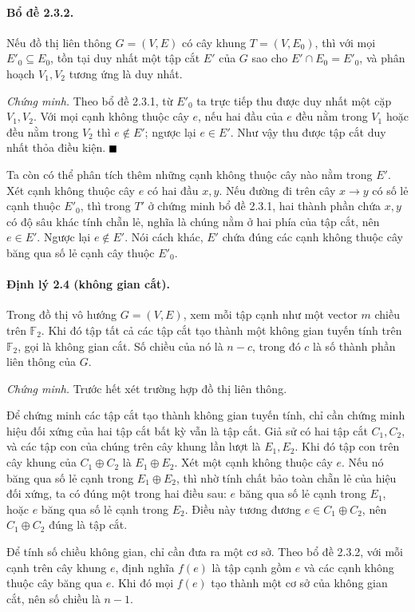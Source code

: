 \documentclass[11pt]{article}
\renewcommand{\leadsto}{\mathrel{\longrightarrow}}
\providecommand{\square}{\mathord{\vcenter{\hrule height .6em width .6em}}}
\begin{document}
\paragraph{Bổ đề 2.3.2.}
Nếu đồ thị liên thông $G=(V,E)$ có cây khung $T=(V,E_0)$, thì với mọi
$E'_0\subseteq E_0$, tồn tại duy nhất một tập cắt $E'$ của $G$ sao cho
$E'\cap E_0=E'_0$, và phân hoạch $V_1,V_2$ tương ứng là duy nhất.

\emph{Chứng minh.}
Theo bổ đề 2.3.1, từ $E'_0$ ta trực tiếp thu được duy nhất một cặp $V_1,V_2$.
Với mọi cạnh không thuộc cây $e$, nếu hai đầu của $e$ đều nằm trong $V_1$ hoặc
đều nằm trong $V_2$ thì $e\notin E'$; ngược lại $e\in E'$. Như vậy thu được tập
cắt duy nhất thỏa điều kiện. \hfill$\square$

Ta còn có thể phân tích thêm những cạnh không thuộc cây nào nằm trong $E'$. Xét
cạnh không thuộc cây $e$ có hai đầu $x,y$. Nếu đường đi trên cây $x\leadsto y$
có số lẻ cạnh thuộc $E'_0$, thì trong $T'$ ở chứng minh bổ đề 2.3.1, hai thành
phần chứa $x,y$ có độ sâu khác tính chẵn lẻ, nghĩa là chúng nằm ở hai phía của
tập cắt, nên $e\in E'$. Ngược lại $e\notin E'$. Nói cách khác, $E'$ chứa đúng
các cạnh không thuộc cây băng qua số lẻ cạnh cây thuộc $E'_0$.

\paragraph{Định lý 2.4 (không gian cắt).}
Trong đồ thị vô hướng $G=(V,E)$, xem mỗi tập cạnh như một vector $m$ chiều trên
$\mathbb F_2$. Khi đó tập tất cả các tập cắt tạo thành một không gian tuyến tính
trên $\mathbb F_2$, gọi là không gian cắt. Số chiều của nó là $n-c$, trong đó
$c$ là số thành phần liên thông của $G$.

\emph{Chứng minh.}
Trước hết xét trường hợp đồ thị liên thông.

Để chứng minh các tập cắt tạo thành không gian tuyến tính, chỉ cần chứng minh
hiệu đối xứng của hai tập cắt bất kỳ vẫn là tập cắt. Giả sử có hai tập cắt
$C_1,C_2$, và các tập con của chúng trên cây khung lần lượt là $E_1,E_2$. Khi
đó tập con trên cây khung của $C_1\oplus C_2$ là $E_1\oplus E_2$. Xét một cạnh
không thuộc cây $e$. Nếu nó băng qua số lẻ cạnh trong $E_1\oplus E_2$, thì nhờ
tính chất bảo toàn chẵn lẻ của hiệu đối xứng, ta có đúng một trong hai điều sau:
$e$ băng qua số lẻ cạnh trong $E_1$, hoặc $e$ băng qua số lẻ cạnh trong $E_2$.
Điều này tương đương $e\in C_1\oplus C_2$, nên $C_1\oplus C_2$ đúng là tập cắt.

Để tính số chiều không gian, chỉ cần đưa ra một cơ sở. Theo bổ đề 2.3.2, với
mỗi cạnh trên cây khung $e$, định nghĩa $f(e)$ là tập cạnh gồm $e$ và các cạnh
không thuộc cây băng qua $e$. Khi đó mọi $f(e)$ tạo thành một cơ sở của không
gian cắt, nên số chiều là $n-1$.
\end{document}
